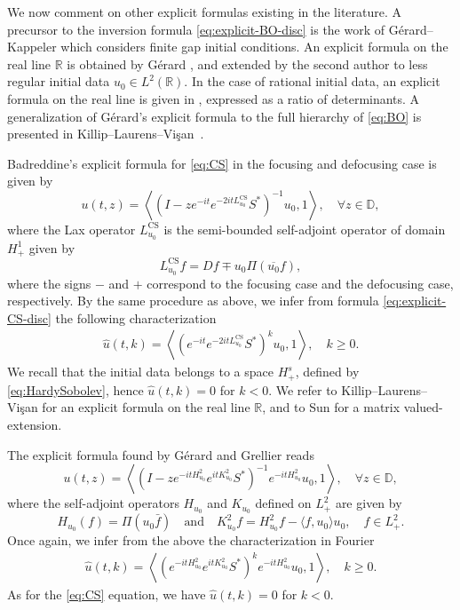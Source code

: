 \documentclass [11pt] {article}
\begin{document}
We now comment on other explicit formulas existing in the literature.
A precursor to the inversion formula \eqref{eq:explicit-BO-disc} is the work of Gérard--Kappeler \cite[Lemma 4.1]{GK21} which considers finite gap initial conditions.
An explicit formula on the real line $\mathbb{R}$ is obtained by Gérard \cite[Theorem~6]{G}, and extended by the second author \cite{Chen} to less regular initial data $u_{0} \in L^{2}(\mathbb{R})$. In the case of rational initial data, an explicit formula on the real line is given in \cite{BGGM24-1}, expressed as a ratio of determinants.
A generalization of Gérard's explicit formula \cite[Theorem~6]{G} to the full hierarchy of \eqref{eq:BO} is presented in Killip--Laurens--Vi\c san~\cite{KLV24}.  
\bigskip

Badreddine's explicit formula for  \eqref{eq:CS} in the focusing \cite[Proposition 2.6]{Bad24} and defocusing \cite[Theorem 1.7]{Bad24} case is given by
\begin{equation}
\label{eq:explicit-CS-disc}
u(t, z)=\left\langle\left(I-z e^{-i t} e^{-2 i t L_{u_0}^{\text{CS}}} S^*\right)^{-1} u_0, 1\right\rangle, \quad \forall z \in \mathbb{D},
\end{equation}
where the Lax operator $L_{u_0}^{\text{CS}}$ is the semi-bounded self-adjoint operator of domain $H^1_{+}$ given by
\[
L_{u_0}^\text{CS} f = Df \mp u_0 \Pi(\overline{u_0}f),
\]
where the signs $-$ and $+$ correspond to the focusing case and the defocusing case, respectively.
By the same procedure as above, we infer from formula \eqref{eq:explicit-CS-disc} the following characterization 
\begin{align}\label{eq:explicitForm2}
\widehat{u}(t,k) =\left\langle (e^{-it}e^{-2itL_{u_0}^{\text{CS}}}S^{*})^k  u_0, 1 \right\rangle, \quad k \ge 0.
\end{align}
We recall that the initial data belongs to a space $H^s_{+}$, defined by \eqref{eq:HardySobolev}, hence $\widehat{u}(t,k) = 0$ for $k<0$.
We refer to Killip--Laurens--Vi\c san \cite{KLV23} for an explicit formula on the real line $\mathbb{R}$, and to Sun \cite{SunCS} for a matrix valued-extension.
\bigskip

The explicit formula found by Gérard and Grellier \cite[Theorem 1]{GG15} reads
\begin{equation}
\label{eq:explicit-S-disc}
u(t, z)=\left\langle\left(I-z e^{-i t H_{u_0}^2} e^{i t K_{u_0}^2} S^*\right)^{-1} e^{-i t H_{u_0}^2} u_0, 1\right\rangle, \quad \forall z \in \mathbb{D},
\end{equation}
where the self-adjoint operators $H_{u_0}$ and $K_{u_0}$ defined on 
$L^2_{+}$ are given by
\[
H_{u_0}(f) = \Pi(u_0 \bar{f })\quad \text{and} \quad K_{u_0}^2f=H_{u_0}^2f-\langle f, u_0\rangle u_0, \quad f \in L^2_{+}.
\]
Once again, we infer from the above the characterization in Fourier
\begin{align}\label{eq:explicitForm3}
\widehat{u}(t,k) =\left\langle (e^{-itH_{u_0}^2}e^{itK_{u_0}^2}S^{*})^k e^{-itH_{u_0}^2}u_0, 1 \right\rangle, \quad k \ge 0.
\end{align}
As for the \eqref{eq:CS} equation, we have $\widehat{u}(t,k) = 0$ for $k<0$.
\end{document}
